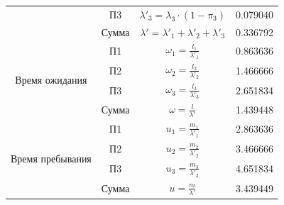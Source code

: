 \begin{adjustbox}{max width=\textwidth}
\begin{tabular}{|c|c|c|c|}
                                    & П3     & $\lambda'_3 = \lambda_3\cdot (1-\pi_3)$                                                                       & 0.079040  \\ \cline{2-4}
                                    & Сумма  & $\lambda' = \lambda'_1+\lambda'_2+\lambda'_3$                                                                 & 0.336792  \\ \hline
\multirow{4}{*}{Время ожидания}     & П1     & $\omega_1 = \frac{l_1}{\lambda'_1}$                                                                           & 0.863636  \\ \cline{2-4}
                                    & П2     & $\omega_2 = \frac{l_2}{\lambda'_2}$                                                                           & 1.466666  \\ \cline{2-4}
                                    & П3     & $\omega_3 = \frac{l_3}{\lambda'_3}$                                                                           & 2.651834  \\ \cline{2-4}
                                    & Сумма  & $\omega = \frac{l}{\lambda'}$                                                                                 & 1.439448  \\ \hline
\multirow{4}{*}{Время пребывания}   & П1     & $u_1 = \frac{m_1}{\lambda'_1}$                                                                                & 2.863636  \\ \cline{2-4}
                                    & П2     & $u_2 = \frac{m_2}{\lambda'_2}$                                                                                & 3.466666  \\ \cline{2-4}
                                    & П3     & $u_3 = \frac{m_3}{\lambda'_3}$                                                                                & 4.651834  \\ \cline{2-4}
                                    & Сумма  & $u = \frac{m}{\lambda'}$                                                                                      & 3.439449  \\ \hline
\end{tabular}
\end{adjustbox}

